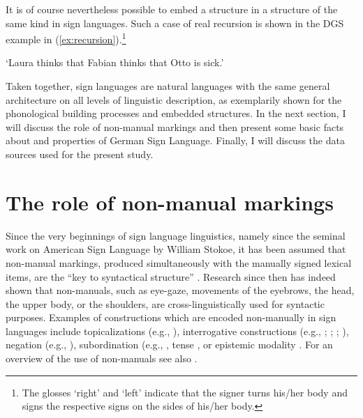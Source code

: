 \noindent It is of course nevertheless possible to embed a structure in a structure of the same kind in sign languages. Such a case of real recursion is shown in the DGS example in (\ref{ex:recursion}).\footnote{ The glosses `right' and `left' indicate that the signer turns his/her body and signs the respective signs on the sides of his/her body.}

\begin{exe}
\ex {}  
\glt `Laura thinks that Fabian thinks that Otto is sick.' \label{ex:recursion}
\end{exe} 

\noindent Taken together, sign languages are natural languages with the same general architecture on all levels of linguistic description, as exemplarily shown for the phonological building processes and embedded structures. In the next section, I will discuss the role of non-manual markings and then present some basic facts about and properties of German Sign Language. Finally, I will discuss the data sources used for the present study.

\section{The role of non-manual markings}\label{sectionnmms}
Since the very beginnings of sign language linguistics, namely since the seminal work on American Sign Language by William Stokoe, it has been assumed that non-manual markings, produced simultaneously with the manually signed lexical items, are the ``key to syntactical structure'' \citep[63]{stokoe1960sign}. Research since then has indeed shown that non-manuals, such as eye-gaze, movements of the eyebrows, the head, the upper body, or the shoulders, are cross-linguistically used for syntactic purposes. Examples of constructions which are encoded non-manually in sign languages include topicalizations (e.g., \citealt{aarons1994aspects, aarons1996topics,brunelli2011antisymmetry}), interrogative constructions (e.g., \citealt{neidle2000syntax}; \citealt{zeshan2004interrogative}; \citealt{zeshan2006negative}; \citealt{brunelli2011antisymmetry}), negation (e.g., \citealt{pfau2002applying, roland2002v, zeshan2004negation, zeshan2006negative}), subordination (e.g., \citealt{wilbur1999syntactic, pfau2005relative, cecchetto2006strategies, branchini2009relatively}, tense \citep{zucchi2009along}, or epistemic modality \citep{bross2017scope}. For an overview of the use of non-manuals see also \citet{pfauquer2010nonmanuals}.

